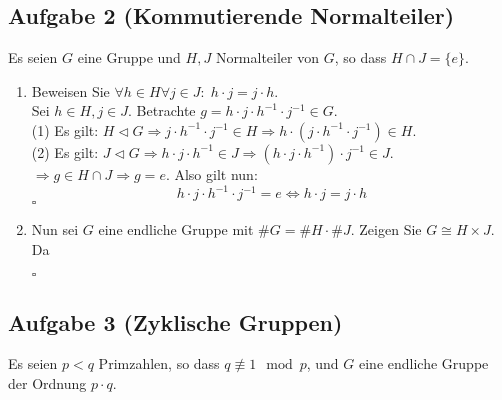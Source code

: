 \documentclass[11pt,a4paper,ngerman]{article}
\begin{document}
\subsection*{Aufgabe 2 \mdseries (Kommutierende Normalteiler)}
Es seien $G$ eine Gruppe und $H,J$ Normalteiler von $G$, so dass $H \cap J = \{e\}$.
\begin{enumerate}[\bfseries a)]
\item  Beweisen Sie $\forall h \in H\forall j \in J :\; h \cdot j = j \cdot h$. \\

Sei $h \in H, j \in J$. Betrachte $g = h \cdot j \cdot h^{-1} \cdot j^{-1} \in G$. \\
(1) Es gilt: $H \lhd G \Rightarrow j \cdot h^{-1} \cdot j^{-1} \in H \Rightarrow h \cdot (j \cdot h^{-1} \cdot j^{-1}) \in H$. \\
(2) Es gilt: $J \lhd G \Rightarrow h \cdot j \cdot h^{-1} \in J \Rightarrow (h \cdot j \cdot h^{-1}) \cdot j^{-1} \in J$. \\
$\Rightarrow g \in H \cap J \Rightarrow g = e$.
Also gilt nun:
$$
h \cdot j \cdot h^{-1} \cdot j^{-1} = e \Leftrightarrow h \cdot j = j \cdot h
$$
\mbox{} \hfill $\square$
\item  Nun sei $G$ eine endliche Gruppe mit $\#G = \#H \cdot \#J$. Zeigen Sie $G \cong H \times J$. \\

Da 

\mbox{} \hfill $\square$
\end{enumerate}



\subsection*{Aufgabe 3 \mdseries (Zyklische Gruppen)}
Es seien $p < q$ Primzahlen, so dass $q \not\equiv 1 \mod p$, und $G$ eine endliche Gruppe der Ordnung $p \cdot q$.
\end{document}
